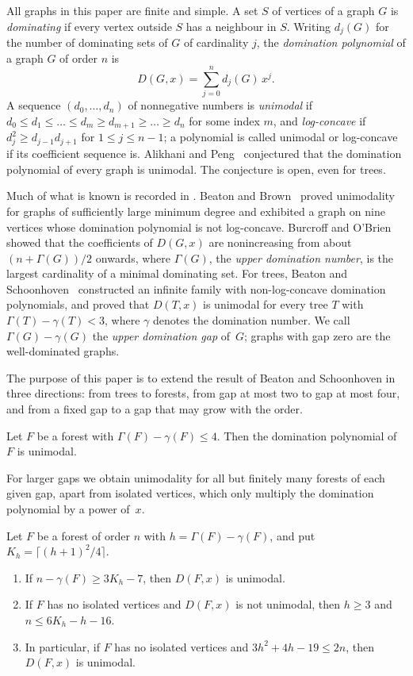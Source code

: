 \documentclass[smallextended,envcountsect,envcountsame]{svjour3}
\begin{document}
All graphs in this paper are finite and simple. A set $S$ of vertices of a
graph $G$ is \emph{dominating} if every vertex outside $S$ has a neighbour
in $S$. Writing $d_j(G)$ for the number of dominating sets of $G$ of
cardinality $j$, the \emph{domination polynomial} of a graph $G$ of order $n$ is
\begingroup\small\[
  D(G,x)=\sum_{j=0}^{n} d_j(G)\,x^j .
\]\endgroup
A sequence $(d_0,\dots,d_n)$ of nonnegative numbers is \emph{unimodal} if
$d_0\le d_1\le\dots\le d_m\ge d_{m+1}\ge\dots\ge d_n$ for some index $m$, and
\emph{log-concave} if $d_j^2\ge d_{j-1}d_{j+1}$ for $1\le j\le n-1$; a
polynomial is called unimodal or log-concave if its coefficient sequence is.
Alikhani and Peng~\cite{AP} conjectured that the domination polynomial of
every graph is unimodal. The conjecture is open, even for trees.

Much of what is known is recorded in
\cite{BB22,BO,BS,DHP,GZ,Omar}. Beaton and Brown~\cite{BB22} proved unimodality for
graphs of sufficiently large minimum degree and exhibited a graph on nine
vertices whose domination polynomial is not log-concave. Burcroff and
O'Brien~\cite{BO} showed that the coefficients of $D(G,x)$ are nonincreasing
from about $(n+\Gamma(G))/2$ onwards, where $\Gamma(G)$, the \emph{upper
domination number}, is the largest cardinality of a minimal dominating set.
For trees, Beaton and Schoonhoven~\cite{BS} constructed an infinite family
with non-log-concave domination polynomials, and proved that $D(T,x)$ is
unimodal for every tree $T$ with $\Gamma(T)-\gamma(T)<3$, where $\gamma$
denotes the domination number. We call $\Gamma(G)-\gamma(G)$ the
\emph{upper domination gap} of~$G$; graphs with gap zero are the
well-dominated graphs.

The purpose of this paper is to extend the result of Beaton and Schoonhoven
in three directions: from trees to forests, from gap at most two to gap at
most four, and from a fixed gap to a gap that may grow with the order.

\begin{theorem}\label{thm:gapfour-intro}
Let $F$ be a forest with $\Gamma(F)-\gamma(F)\le 4$. Then the domination
polynomial of $F$ is unimodal.
\end{theorem}

For larger gaps we obtain unimodality for all but finitely many forests of
each given gap, apart from isolated vertices, which only multiply the
domination polynomial by a power of~$x$.

\begin{theorem}\label{thm:criterion-intro}
Let $F$ be a forest of order $n$ with $h=\Gamma(F)-\gamma(F)$, and put
$K_h=\lceil (h+1)^2/4\rceil$.
\begin{enumerate}
\item[\textup{(i)}] If $n-\gamma(F)\ge 3K_h-7$, then $D(F,x)$ is unimodal.
\item[\textup{(ii)}] If $F$ has no isolated vertices and $D(F,x)$ is not
unimodal, then $h\ge 3$ and $n\le 6K_h-h-16$.
\item[\textup{(iii)}] In particular, if $F$ has no isolated vertices and
$3h^2+4h-19\le 2n$, then $D(F,x)$ is unimodal.
\end{enumerate}
\end{theorem}
\end{document}
